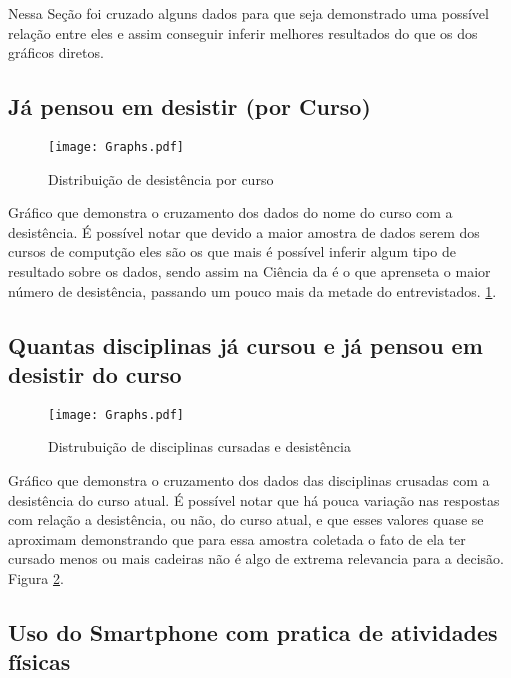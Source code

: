 \documentclass[11pt]{scrartcl} %
\begin{document}
Nessa Seção foi cruzado alguns dados para que seja demonstrado uma possível relação entre eles e assim conseguir inferir melhores resultados do que os dos gráficos diretos.

\subsection{Já pensou em desistir (por Curso)}

\begin{figure}[h]
  \centering
  \texttt{[image: Graphs.pdf]}
  \label{fig:graph10}
  \caption{Distribuição de desistência por curso}
\end{figure}

Gráfico que demonstra o cruzamento dos dados do nome do curso com a desistência. É possível notar que devido a maior amostra de dados serem dos cursos de computção eles são os que mais é possível inferir algum tipo de resultado sobre os dados, sendo assim na Ciência da é o que aprenseta o maior número de desistência, passando um pouco mais da metade do entrevistados. \ref{fig:graph10}.

\clearpage

\subsection{Quantas disciplinas já cursou e já pensou em desistir do curso}

\begin{figure}[h]
  \centering
  \texttt{[image: Graphs.pdf]}
  \label{fig:graph11}
  \caption{Distrubuição de disciplinas cursadas e desistência}
\end{figure}

Gráfico que demonstra o cruzamento dos dados das disciplinas crusadas com a desistência do curso atual. É possível notar que há pouca variação nas respostas com relação a desistência, ou não, do curso atual, e que esses valores quase se aproximam demonstrando que para essa amostra coletada o fato de ela ter cursado menos ou mais cadeiras não é algo de extrema relevancia para a decisão. Figura \ref{fig:graph11}.

\clearpage

\subsection{Uso do Smartphone com pratica de atividades físicas}
\end{document}
